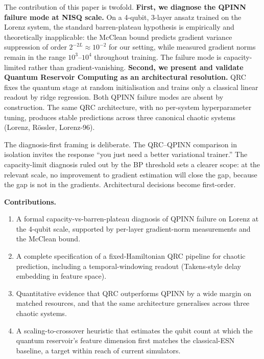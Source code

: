 \documentclass[a4paper,12pt]{iopart}
\begin{document}
The contribution of this paper is twofold.
\textbf{First, we diagnose the QPINN failure mode at NISQ scale.} On a
4-qubit, 3-layer ansatz trained on the Lorenz system, the standard
barren-plateau hypothesis is empirically and theoretically inapplicable:
the McClean bound predicts gradient variance suppression of order
$2^{-2L} \approx 10^{-2}$ for our setting, while measured gradient
norms remain in the range $10^3$--$10^4$ throughout training. The
failure mode is capacity-limited rather than gradient-vanishing.
\textbf{Second, we present and validate Quantum Reservoir Computing as
an architectural resolution.} QRC fixes the quantum stage at random
initialisation and trains only a classical linear readout by ridge
regression. Both QPINN failure modes are absent by construction. The
same QRC architecture, with no per-system hyperparameter tuning,
produces stable predictions across three canonical chaotic systems
(Lorenz, R\"{o}ssler, Lorenz-96).

The diagnosis-first framing is deliberate. The QRC--QPINN comparison
in isolation invites the response ``you just need a better variational
trainer.'' The capacity-limit diagnosis ruled out by the BP threshold
sets a clearer scope: at the relevant scale, no improvement to gradient
estimation will close the gap, because the gap is not in the gradients.
Architectural decisions become first-order.

\textbf{Contributions.}
\begin{enumerate}
  \item A formal capacity-vs-barren-plateau diagnosis of QPINN failure
        on Lorenz at the 4-qubit scale, supported by per-layer
        gradient-norm measurements and the McClean bound.
  \item A complete specification of a fixed-Hamiltonian QRC pipeline
        for chaotic prediction, including a temporal-windowing readout
        (Takens-style delay embedding in feature space).
  \item Quantitative evidence that QRC outperforms QPINN by a wide
        margin on matched resources, and that the same architecture
        generalises across three chaotic systems.
  \item A scaling-to-crossover heuristic that estimates the qubit
        count at which the quantum reservoir's feature dimension first
        matches the classical-ESN baseline, a target within reach of
        current simulators.
\end{enumerate}

\end{document}
